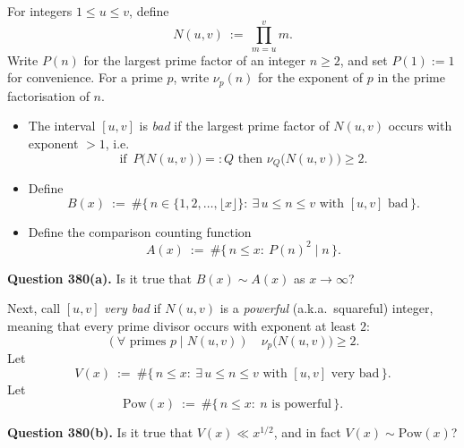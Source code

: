 For integers $1\le u\le v$, define
\[
N(u,v)\ :=\ \prod_{m=u}^{v} m.
\]
Write $P(n)$ for the largest prime factor of an integer $n\ge 2$, and set $P(1):=1$ for convenience. For a prime $p$, write $\nu_p(n)$ for the exponent of $p$ in the prime factorisation of $n$.

\begin{itemize}[leftmargin=2em]
\item The interval $[u,v]$ is \emph{bad} if the largest prime factor of $N(u,v)$ occurs with exponent $>1$, i.e.
\[
\text{if }\, P\bigl(N(u,v)\bigr)=:Q \text{ then } \nu_Q\bigl(N(u,v)\bigr)\ge 2.
\]
\item Define
\[
B(x)\ :=\ \#\{\,n\in\{1,2,\dots,\lfloor x\rfloor\}:\ \exists\,u\le n\le v \text{ with } [u,v]\text{ bad}\,\}.
\]
\item Define the comparison counting function
\[
A(x)\ :=\ \#\{\,n\le x:\ P(n)^2\mid n\,\}.
\]
\end{itemize}

\noindent\textbf{Question 380(a).} Is it true that $B(x)\sim A(x)$ as $x\to\infty$?

\medskip

\noindent Next, call $[u,v]$ \emph{very bad} if $N(u,v)$ is a \emph{powerful} (a.k.a.\ squareful) integer, meaning that every prime divisor occurs with exponent at least $2$:
\[
(\forall \text{ primes }p\mid N(u,v))\quad \nu_p\bigl(N(u,v)\bigr)\ge 2.
\]
Let
\[
V(x)\ :=\ \#\{\,n\le x:\ \exists\,u\le n\le v \text{ with } [u,v]\text{ very bad}\,\}.
\]
Let
\[
\mathrm{Pow}(x)\ :=\ \#\{\,n\le x:\ n\text{ is powerful}\,\}.
\]

\noindent\textbf{Question 380(b).} Is it true that $V(x)\ll x^{1/2}$, and in fact $V(x)\sim \mathrm{Pow}(x)$?
